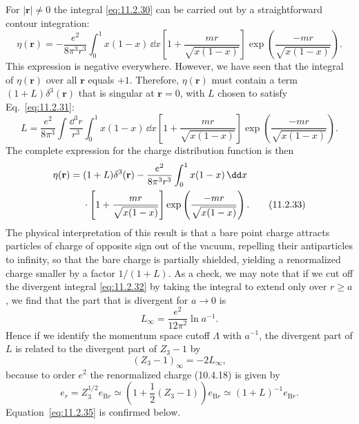 

For $|\mathbf r|\ne0$ the integral \eqref{eq:11.2.30} can be carried out by a
straightforward contour integration:
\[
  \eta(\mathbf r)=-\frac{e^2}{8\pi^3r^3}\int_0^1x(1-x)\,\dd x
  \left[1+\frac{mr}{\sqrt{x(1-x)}}\right]
  \exp\left(\frac{-mr}{\sqrt{x(1-x)}}\right).
\]
This expression is negative everywhere. However, we have seen that the
integral of $\eta(\mathbf r)$ over all $\mathbf r$ equals $+1$. Therefore,
$\eta(\mathbf r)$ must contain a term $(1+L)\delta^3(\mathbf r)$ that is
singular at $\mathbf r=0$, with $L$ chosen to satisfy Eq.~\eqref{eq:11.2.31}:
\begin{equation}
  L=\frac{e^2}{8\pi^3}\int\frac{\dd^3r}{r^3}\int_0^1x(1-x)\,\dd x
  \left[1+\frac{mr}{\sqrt{x(1-x)}}\right]
  \exp\left(\frac{-mr}{\sqrt{x(1-x)}}\right).
  \tag{11.2.32}\label{eq:11.2.32}
\end{equation}
The complete expression for the charge distribution function is then
\begin{align}
  \eta(\mathbf r)={}&(1+L)\delta^3(\mathbf r)
  -\frac{e^2}{8\pi^3r^3}\int_0^1x(1-x)\,\dd x\notag\\
  &\cdot\left[1+\frac{mr}{\sqrt{x(1-x)}}\right]
  \exp\left(\frac{-mr}{\sqrt{x(1-x)}}\right).
  \tag{11.2.33}\label{eq:11.2.33}
\end{align}
The physical interpretation of this result is that a bare point charge
attracts particles of charge of opposite sign out of the vacuum, repelling
their antiparticles to infinity, so that the bare charge is partially shielded,
yielding a renormalized charge smaller by a factor $1/(1+L)$. As a check,
we may note that if we cut off the divergent integral \eqref{eq:11.2.32} by taking the
integral to extend only over $r\ge a$, we find that the part that is divergent
for $a\to0$ is
\begin{equation}
  L_\infty=\frac{e^2}{12\pi^2}\ln a^{-1}.
  \tag{11.2.34}\label{eq:11.2.34}
\end{equation}
Hence if we identify the momentum space cutoff $\Lambda$ with $a^{-1}$,
the divergent part of $L$ is related to the divergent part of $Z_3-1$ by
\begin{equation}
  (Z_3-1)_\infty=-2L_\infty,
  \tag{11.2.35}\label{eq:11.2.35}
\end{equation}
because to order $e^2$ the renormalized charge (10.4.18) is given by
\begin{equation}
  e_r=Z_3^{1/2}e_{\mathrm B r}\simeq
  \left(1+\frac12(Z_3-1)\right)e_{\mathrm B r}\simeq
  (1+L)^{-1}e_{\mathrm B r}.
  \tag{11.2.36}\label{eq:11.2.36}
\end{equation}
Equation~\eqref{eq:11.2.35} is confirmed below.

